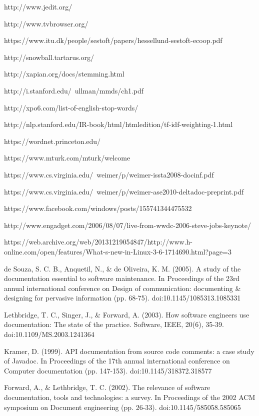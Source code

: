 \documentclass[preprint]{sigplanconf}
\begin{document}




\begin{thebibliography}{}
\softraggedright

http://www.jedit.org/

http://www.tvbrowser.org/

https://www.itu.dk/people/sestoft/papers/hessellund-sestoft-ecoop.pdf

http://snowball.tartarus.org/

http://xapian.org/docs/stemming.html

http://i.stanford.edu/~ullman/mmds/ch1.pdf

http://xpo6.com/list-of-english-stop-words/

http://nlp.stanford.edu/IR-book/html/htmledition/tf-idf-weighting-1.html

https://wordnet.princeton.edu/

https://www.mturk.com/mturk/welcome

https://www.cs.virginia.edu/~weimer/p/weimer-issta2008-docinf.pdf

https://www.cs.virginia.edu/~weimer/p/weimer-ase2010-deltadoc-preprint.pdf

https://www.facebook.com/windows/posts/155741344475532

http://www.engadget.com/2006/08/07/live-from-wwdc-2006-steve-jobs-keynote/

https://web.archive.org/web/20131219054847/http://www.h-online.com/open/features/What-s-new-in-Linux-3-6-1714690.html?page=3

de Souza, S. C. B., Anquetil, N., \& de Oliveira, K. M. (2005). A study of the documentation essential to software maintenance. In Proceedings of the 23rd annual international conference on Design of communication: documenting \& designing for pervasive information (pp. 68-75). doi:10.1145/1085313.1085331

Lethbridge, T. C., Singer, J., \& Forward, A. (2003). How software engineers use documentation: The state of the practice. Software, IEEE, 20(6), 35-39. doi:10.1109/MS.2003.1241364

Kramer, D. (1999). API documentation from source code comments: a case study of Javadoc. In Proceedings of the 17th annual international conference on Computer documentation (pp. 147-153). doi:10.1145/318372.318577

Forward, A., \& Lethbridge, T. C. (2002). The relevance of software documentation, tools and technologies: a survey. In Proceedings of the 2002 ACM symposium on Document engineering (pp. 26-33). doi:10.1145/585058.585065

\end{thebibliography}
\end{document}
